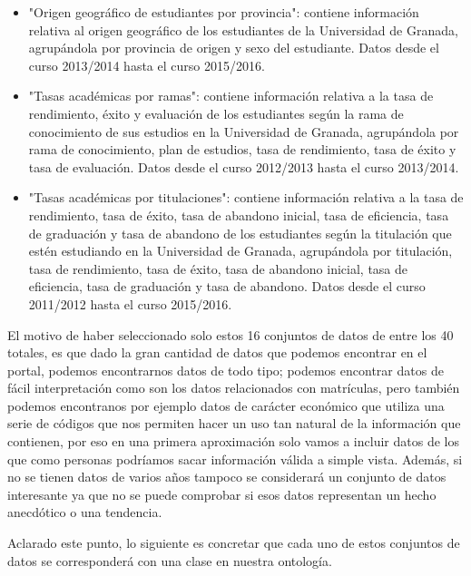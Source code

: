 \begin{itemize}
	\item "Origen geográfico de estudiantes por provincia": contiene información relativa al origen geográfico de los estudiantes de la Universidad de Granada, agrupándola por provincia de origen y sexo del estudiante. Datos desde el curso 2013/2014 hasta el curso 2015/2016.
	\item "Tasas académicas por ramas": contiene información relativa a la tasa de rendimiento, éxito y evaluación de los estudiantes según la rama de conocimiento de sus estudios en la Universidad de Granada, agrupándola por rama de conocimiento, plan de estudios, tasa de rendimiento, tasa de éxito y tasa de evaluación. Datos desde el curso 2012/2013 hasta el curso 2013/2014.
	\item "Tasas académicas por titulaciones": contiene información relativa a la tasa de rendimiento, tasa de éxito, tasa de abandono inicial, tasa de eficiencia, tasa de graduación y tasa de abandono de los estudiantes según la titulación que estén estudiando en la Universidad de Granada, agrupándola por titulación, tasa de rendimiento, tasa de éxito, tasa de abandono inicial, tasa de eficiencia, tasa de graduación y tasa de abandono. Datos desde el curso 2011/2012 hasta el curso 2015/2016.
\end{itemize}

El motivo de haber seleccionado solo estos 16 conjuntos de datos de entre los 40 totales, es que dado la gran cantidad de datos que podemos encontrar en el portal, podemos encontrarnos datos de todo tipo; podemos encontrar datos de fácil interpretación como son los datos relacionados con matrículas, pero también podemos encontranos por ejemplo datos de carácter económico que utiliza una serie de códigos que nos permiten hacer un uso tan natural de la información que contienen, por eso en una primera aproximación solo vamos a incluir datos de los que como personas podríamos sacar información válida a simple vista. Además, si no se tienen datos de varios años tampoco se considerará un conjunto de datos interesante ya que no se puede comprobar si esos datos representan un hecho anecdótico o una tendencia.

\bigskip

Aclarado este punto, lo siguiente es concretar que cada uno de estos conjuntos de datos se corresponderá con una clase en nuestra ontología.

